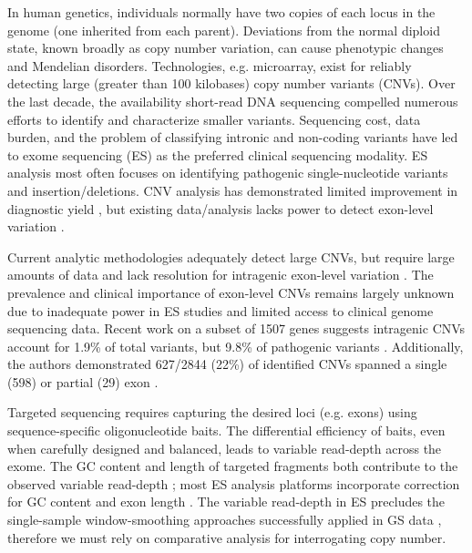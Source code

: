 \documentclass{article}\usepackage[]{graphicx}\usepackage[]{color}
\begin{document}
In human genetics, individuals normally have two copies of each locus in the genome (one inherited from each parent).
Deviations from the normal diploid state, known broadly as copy number variation, can cause phenotypic changes and Mendelian disorders.
Technologies, e.g. microarray, exist for reliably detecting large (greater than 100 kilobases) copy number variants (CNVs).
Over the last decade, the availability short-read DNA sequencing compelled numerous efforts to identify and characterize smaller variants.
Sequencing cost, data burden, and the problem of classifying intronic and non-coding variants have led to exome sequencing (ES) as the preferred clinical sequencing modality.
ES analysis most often focuses on identifying pathogenic single-nucleotide variants and insertion/deletions.
CNV analysis has demonstrated limited improvement in diagnostic yield \cite{marchuk:2018aa}, but existing data/analysis lacks power to detect exon-level variation \cite{retterer:2015aa,yao:2017aa}.

Current analytic methodologies adequately detect large CNVs, but require large amounts of data and lack resolution for intragenic exon-level variation \cite{plagnol:2012aa,krumm:2012aa,fromer:2012aa,jiang:2015aa}.
The prevalence and clinical importance of exon-level CNVs remains largely unknown due to inadequate power in ES studies and limited access to clinical genome sequencing data.
Recent work on a subset of 1507 genes suggests intragenic CNVs account for 1.9\% of total variants, but 9.8\% of pathogenic variants \cite{truty:2019aa}.
Additionally, the authors demonstrated 627/2844 (22\%) of identified CNVs spanned a single (598) or partial (29) exon \cite{truty:2019aa}.

Targeted sequencing requires capturing the desired loci (e.g. exons) using sequence-specific oligonucleotide baits.
The differential efficiency of baits, even when carefully designed and balanced, leads to variable read-depth across the exome.
The GC content and length of targeted fragments both contribute to the observed variable read-depth \cite{benjamini:2012aa}; most ES analysis platforms incorporate correction for GC content and exon length \cite{kadalayil:2015aa}.
The variable read-depth in ES precludes the single-sample window-smoothing approaches successfully applied in GS data \cite{chiang:2009aa}, therefore we must rely on comparative analysis for interrogating copy number.
\end{document}
